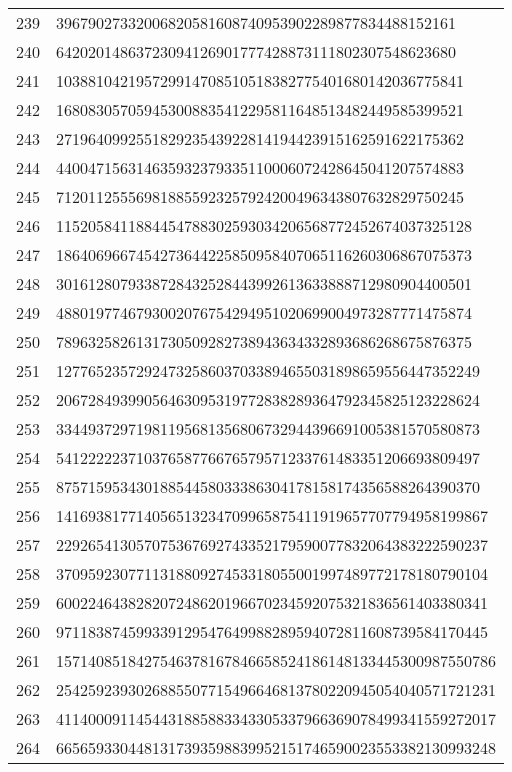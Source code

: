 \documentclass[12pt]{article}
\begin{document}
\begin{tabular}{l|l}
239 & 39679027332006820581608740953902289877834488152161 \\
240 & 64202014863723094126901777428873111802307548623680 \\
241 & 103881042195729914708510518382775401680142036775841 \\
242 & 168083057059453008835412295811648513482449585399521 \\
243 & 271964099255182923543922814194423915162591622175362 \\
244 & 440047156314635932379335110006072428645041207574883 \\
245 & 712011255569818855923257924200496343807632829750245 \\
246 & 1152058411884454788302593034206568772452674037325128 \\
247 & 1864069667454273644225850958407065116260306867075373 \\
248 & 3016128079338728432528443992613633888712980904400501 \\
249 & 4880197746793002076754294951020699004973287771475874 \\
250 & 7896325826131730509282738943634332893686268675876375 \\
251 & 12776523572924732586037033894655031898659556447352249 \\
252 & 20672849399056463095319772838289364792345825123228624 \\
253 & 33449372971981195681356806732944396691005381570580873 \\
254 & 54122222371037658776676579571233761483351206693809497 \\
255 & 87571595343018854458033386304178158174356588264390370 \\
256 & 141693817714056513234709965875411919657707794958199867 \\
257 & 229265413057075367692743352179590077832064383222590237 \\
258 & 370959230771131880927453318055001997489772178180790104 \\
259 & 600224643828207248620196670234592075321836561403380341 \\
260 & 971183874599339129547649988289594072811608739584170445 \\
261 & 1571408518427546378167846658524186148133445300987550786 \\
262 & 2542592393026885507715496646813780220945054040571721231 \\
263 & 4114000911454431885883343305337966369078499341559272017 \\
264 & 6656593304481317393598839952151746590023553382130993248 \\

\end{tabular}
\end{document}
